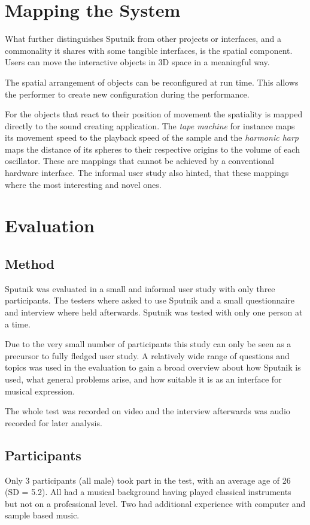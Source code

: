 \documentclass[10pt,a4paper]{scrartcl}
\begin{document}
\section{Mapping the System}
What further distinguishes Sputnik from other projects or interfaces, and a commonality it shares with some tangible interfaces, is the spatial component. Users can move the interactive objects in 3D space in a meaningful way.

The spatial arrangement of objects can be reconfigured at run time. This allows the performer to create new configuration during the performance. 

For the objects that react to their position of movement the spatiality is mapped directly to the sound creating application. The \emph{tape machine} for instance maps its movement speed to the playback speed of the sample and the \emph{harmonic harp} maps the distance of its spheres to their respective origins to the volume of each oscillator. These are mappings that cannot be achieved by a conventional hardware interface. The informal user study also hinted, that these mappings where the most interesting and novel ones.



\section{Evaluation}
\label{sec:evaluation}

\subsection{Method}
Sputnik was evaluated in a small and informal user study with only three participants. The testers where asked to use Sputnik and a small questionnaire and interview where held afterwards. Sputnik was tested with only one person at a time.

Due to the very small number of participants this study can only be seen as a precursor to fully fledged user study. A relatively wide range of questions and topics was used in the evaluation to gain a broad overview about how Sputnik is used, what general problems arise, and how suitable it is as an interface for musical expression.

The whole test was recorded on video and the interview afterwards was audio recorded for later analysis.

\subsection{Participants}
Only 3 participants (all male) took part in the test, with an average age of 26 (SD = 5.2). All had a musical background having played classical instruments but not on a professional level. Two had additional experience with computer and sample based music.
\end{document}

